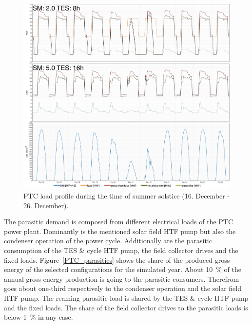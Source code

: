 \begin{figure}[htbp]  
\centering
\includegraphics[width=1\linewidth]{FIG/PTC_summer_load}
\caption[PTC load profile during the time of summer solstice (16. December - 26. December).]{PTC load profile during the time of summer solstice (16. December - 26. December).}\label{PTC_summer_load}
\end{figure}
The parasitic demand is composed from different electrical loads of the PTC power plant. Dominantly is the mentioned solar field HTF pump but also the condenser operation of the power cycle. Additionally are the parasitic consumption of the TES \& cycle HTF pump, the field collector drives and the fixed loads. Figure~\ref{PTC_parasitics} shows the share of the produced gross energy of the selected configurations for the simulated year. About 10~\% of the annual gross energy production is going to the parasitic consumers. Therefrom goes about one-third respectively to the condenser operation and the solar field HTF pump. The reaming parasitic load is shared by the TES \& cycle HTF pump and the fixed loads. The share of the field collector drives to the parasitic loads is below 1~\% in any case.

